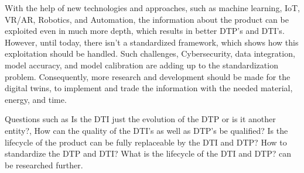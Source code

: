 \documentclass[conference]{IEEEtran}
\begin{document}
    With the help of new technologies and approaches, such as machine learning, IoT, VR/AR, Robotics, and Automation,  the information about the product can be exploited even in much more depth, which results in better DTP's and DTI's. However, until today, there isn't a standardized framework, which shows how this exploitation should be handled. Such challenges, Cybersecurity, data integration, model accuracy, and model calibration are adding up to the standardization problem. Consequently, more research and development should be made for the digital twins, to implement and trade the information with the needed material, energy, and time. 

    Questions such as Is the DTI just the evolution of the DTP or is it another entity?, How can the quality of the DTI's as well as DTP's be qualified? Is the lifecycle of the product can be fully replaceable by the DTI and DTP? How to standardize the DTP and DTI? What is the lifecycle of the DTI and DTP?  can be researched further.
    
    
    
\end{document}
